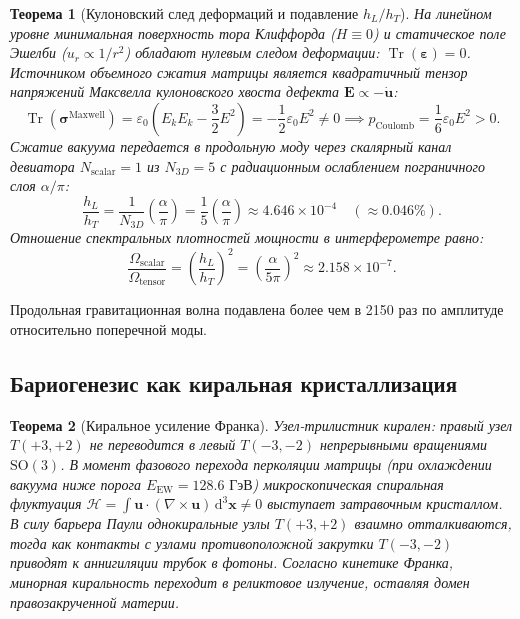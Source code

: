 \documentclass[11pt,a4paper]{article}
\newtheorem{theorem}{Теорема}
\theoremstyle{definition}
\theoremstyle{remark}
\begin{document}
\begin{theorem}[Кулоновский след деформаций и подавление $h_L / h_T$]
	\label{thm:coulomb_gw_suppression}
	На линейном уровне минимальная поверхность тора Клиффорда ($H \equiv 0$) и статическое поле Эшелби ($u_r \propto 1/r^2$) обладают нулевым следом деформации: $\operatorname{Tr}(\boldsymbol{\varepsilon}) = 0$. Источником объемного сжатия матрицы является квадратичный тензор напряжений Максвелла кулоновского хвоста дефекта $\mathbf{E} \propto -\dot{\mathbf{u}}$:
	\begin{equation}
		\operatorname{Tr}(\boldsymbol{\sigma}^{\mathrm{Maxwell}}) = \varepsilon_0 \left( E_k E_k - \frac{3}{2} E^2 \right) = -\frac{1}{2}\varepsilon_0 E^2 \ne 0 \implies p_{\mathrm{Coulomb}} = \frac{1}{6}\varepsilon_0 E^2 > 0.
		\label{eq:maxwell_stress_trace}
	\end{equation}
	Сжатие вакуума передается в продольную моду через скалярный канал девиатора $N_{\mathrm{scalar}} = 1$ из $N_{3D} = 5$ с радиационным ослаблением пограничного слоя $\alpha/\pi$:
	\begin{equation}
		\frac{h_L}{h_T} = \frac{1}{N_{3D}} \left(\frac{\alpha}{\pi}\right) = \frac{1}{5}\left(\frac{\alpha}{\pi}\right) \approx 4.646 \times 10^{-4} \quad (\approx 0.046\%).
		\label{eq:gw_scalar_amplitude_suppression}
	\end{equation}
	Отношение спектральных плотностей мощности в интерферометре равно:
	\begin{equation}
		\frac{\Omega_{\mathrm{scalar}}}{\Omega_{\mathrm{tensor}}} = \left(\frac{h_L}{h_T}\right)^2 = \left(\frac{\alpha}{5\pi}\right)^2 \approx 2.158 \times 10^{-7}.
		\label{eq:gw_scalar_power_suppression}
	\end{equation}
\end{theorem}
Продольная гравитационная волна подавлена более чем в 2150 раз по амплитуде относительно поперечной моды.

\subsection{Бариогенезис как киральная кристаллизация}

\begin{theorem}[Киральное усиление Франка]
\label{thm:baryogenesis_chiral}
Узел-трилистник кирален: правый узел $T(+3, +2)$ не переводится в левый $T(-3, -2)$ непрерывными вращениями $\mathrm{SO}(3)$. В момент фазового перехода перколяции матрицы (при охлаждении вакуума ниже порога $E_{\mathrm{EW}} = 128.6\text{ ГэВ}$) микроскопическая спиральная флуктуация $\mathcal{H} = \int \mathbf{u} \cdot (\nabla \times \mathbf{u})\,\mathrm{d}^3\mathbf{x} \ne 0$ выступает затравочным кристаллом. В силу барьера Паули однокиральные узлы $T(+3,+2)$ взаимно отталкиваются, тогда как контакты с узлами противоположной закрутки $T(-3,-2)$ приводят к аннигиляции трубок в фотоны. Согласно кинетике Франка, минорная киральность переходит в реликтовое излучение, оставляя домен правозакрученной материи.
\end{theorem}
\end{document}
